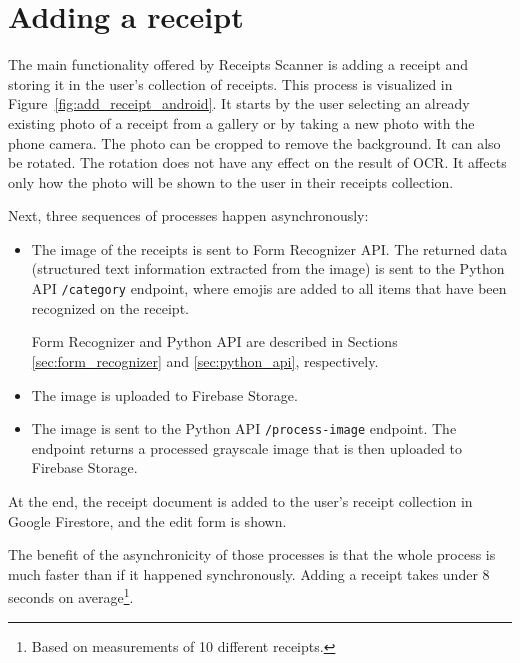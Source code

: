 \documentclass[
  digital, %
  table,   %
  oneside, %
  lof,     %
  lot,     %
]{fithesis3}
\begin{document}
\section{Adding a receipt}
The main functionality offered by Receipts Scanner is adding a receipt and storing it in the user's collection of receipts.
This process is visualized in Figure~\ref{fig:add_receipt_android}.
It starts by the user selecting an already existing photo of a receipt from a gallery or by taking a new photo with the phone camera. The photo can be cropped to remove the background. It can also be rotated. The rotation does not have any effect on the result of OCR. It affects only how the photo will be shown to the user in their receipts collection.

Next, three sequences of processes happen asynchronously:

\begin{itemize}
    \item The image of the receipts is sent to Form Recognizer API. The returned data (structured text information extracted from the image) is sent to the Python API \texttt{/category} endpoint, where emojis are added to all items that have been recognized on the receipt.
    
    Form Recognizer and Python API are described in Sections \ref{sec:form_recognizer} and \ref{sec:python_api}, respectively.
    
    \item The image is uploaded to Firebase Storage.

    \item The image is sent to the Python API \texttt{/process-image} endpoint. The endpoint returns a processed grayscale image that is then uploaded to Firebase Storage.
\end{itemize}

At the end, the receipt document is added to the user's receipt collection in Google Firestore, and the edit form is shown. 

The benefit of the asynchronicity of those processes is that the whole process is much faster than if it happened synchronously. Adding a receipt takes under 8 seconds on average\footnote{Based on measurements of 10 different receipts.}.
\end{document}
